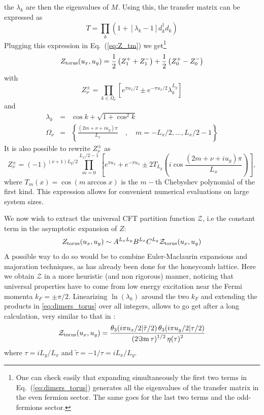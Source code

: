 \documentclass[11pt]{iopart}
\begin{document}
the $\lambda_k$ are then the eigenvalues of $M$. Using this, the transfer matrix can be expressed as
\begin{equation}
 T=\prod_k \left(1+[\lambda_k -1]d_k^\dag d_k \right)
\end{equation}
Plugging this expression in Eq.~(\ref{eq:Z_tm}) we get\footnote{One can check easily that expanding simultaneously the first two terms in Eq.~(\ref{eq:dimers_torus}) generates all the eigenvalues of the transfer matrix in the even fermion sector. The same goes for the last two terms and the odd-fermions sector. }
\begin{equation}\label{eq:dimers_torus}
 Z_{\rm torus}(u_x,u_y)=\frac{1}{2}\left(Z_1^{+}+Z_1^{-}\right)+\frac{1}{2}\left(Z_0^{+}-Z_0^{-}\right)
\end{equation}
with
\begin{equation}\label{eq:torus01}
 Z_\nu^{\pm}=\prod_{k\in \Omega_{\nu}}\left[e^{\pi u_x /2}\pm e^{-\pi u_x/2}\lambda_k^{L_y}\right]
\end{equation}
and
\begin{eqnarray}\label{eq:lambda}
 \lambda_k&=&\cos k +\sqrt{1+\cos^2 k}\\
\Omega_{\nu}&=&\left\{\frac{(2m+\nu+i u_y) \pi}{L_x}\quad,\quad m=-L_x/2,\ldots,L_x/2-1\right\} 
\end{eqnarray}
It is also possible to rewrite $Z_\nu^\pm$ as 
\begin{equation}\label{eq:torus_cheb}
 Z_\nu^\pm=(-1)^{(\nu+1)L_y/2}\prod_{m=0}^{L_x/2-1}\left[e^{\pi u_x}+e^{-\pi u_x}\pm 2 T_{L_y}\left(i\cos \frac{(2m+\nu+iu_y)\pi}{L_x}\right)\right],
\end{equation}
where $T_m(x)=\cos(m\arccos x)$ is the $m-$th Chebyshev polynomial of the first kind. This expression allows for convenient numerical evaluations on large system sizes.

We now wish to extract the universal CFT partition function $\mathcal{Z}$, i.e the constant term in the asymptotic expansion of $Z$:
\begin{equation}
 Z_{\rm torus}(u_x,u_y)\sim A^{L_x L_y} B^{L_x} C^{L_y}\mathcal{Z}_{\rm torus}(u_x,u_y)
\end{equation}
A possible way to do so would be to combine Euler-Maclaurin expansions and majoration techniques, as has already been done for the honeycomb lattice\cite{Boutillier}. Here we obtain $\mathcal{Z}$ in a more heuristic (and non rigorous) manner, noticing that universal properties have to come from low energy excitation near the Fermi momenta $k_F=\pm \pi/2$. Linearizing $\ln(\lambda_k)$ around the two $k_F$ and extending the products in \ref{eq:dimers_torus} over all integers, allows to go get after a long calculation, very similar to that in \cite{Boutillier}:
\begin{equation}
 \mathcal{Z}_{\rm torus}(u_x,u_y)=\frac{\displaystyle{\theta_3(i\pi u_x/2|\tilde{\tau}/2)\,\theta_3(i\pi u_y/2|\tau/2)}}{\displaystyle{(2 \Im{\rm m}\, \tau)^{1/2}\,\eta(\tau)^2}}
\end{equation}
where $\tau=i L_y/L_x$ and $\tilde{\tau}=-1/\tau=iL_x/L_y$. 
\end{document}
